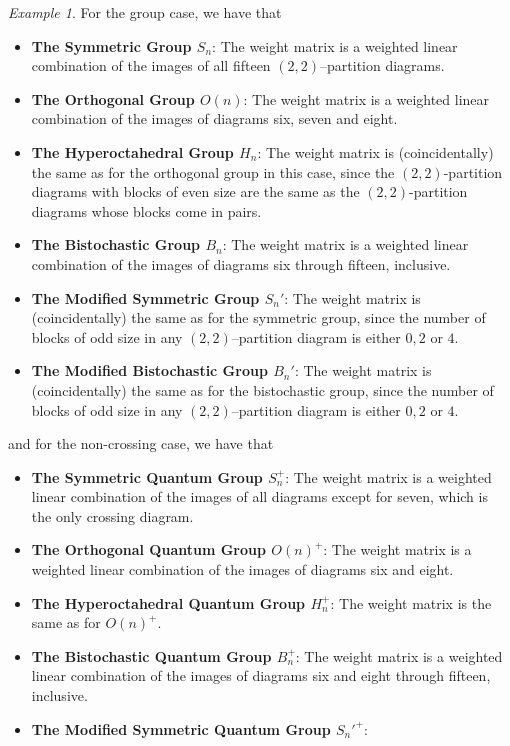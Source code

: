 \documentclass{article}
\theoremstyle{plain}
\theoremstyle{definition}
\theoremstyle{remark}
\newtheorem{example}[theorem]{Example}
\begin{document}
\begin{example}
For the group case, we have that
\begin{itemize}
	\item
		\textbf{The Symmetric Group $S_n$}:
		The weight matrix is a weighted linear combination of the images of
		all fifteen $(2,2)$--partition diagrams.
	\item 
		\textbf{The Orthogonal Group $O(n)$}:
		The weight matrix is a weighted linear combination of the images of
		diagrams six, seven and eight.
	\item
		\textbf{The Hyperoctahedral Group $H_n$}:
		The weight matrix is (coincidentally) the same as for the orthogonal 
		group in this case, since the $(2,2)$-partition diagrams with blocks 
		of even size are the same as the $(2,2)$-partition diagrams whose 
		blocks come in pairs.
	\item
		\textbf{The Bistochastic Group $B_n$}:
		The weight matrix is a weighted linear combination of the images of
		diagrams six through fifteen, inclusive.
	\item
		\textbf{The Modified Symmetric Group $S_n'$}:
		The weight matrix is (coincidentally) the same as for the symmetric 
		group, since the number of blocks of odd size in any 
		$(2,2)$--partition diagram is either $0, 2$ or $4$.
	\item
		\textbf{The Modified Bistochastic Group $B_n'$}:
		The weight matrix is (coincidentally) the same as for the bistochastic 
		group, since the number of blocks of odd size in any 
		$(2,2)$--partition diagram is either $0, 2$ or $4$.
\end{itemize}
and for the non-crossing case, we have that
\begin{itemize}
	\item
		\textbf{The Symmetric Quantum Group $S_n^{+}$}:
		The weight matrix is a weighted linear combination of the images of
		all diagrams except for seven, which is the only crossing diagram.
	\item
		\textbf{The Orthogonal Quantum Group $O(n)^{+}$}:
		The weight matrix is a weighted linear combination of the images of
		diagrams six and eight.
	\item
		\textbf{The Hyperoctahedral Quantum Group $H_n^{+}$}:
		The weight matrix is the same as for $O(n)^{+}$.
	\item
		\textbf{The Bistochastic Quantum Group $B_n^{+}$}:
		The weight matrix is a weighted linear combination of the images of
		diagrams six and eight through fifteen, inclusive.	
	\item
		\textbf{The Modified Symmetric Quantum Group $S_n'^{+}$}:

\end{itemize}
\end{example}
\end{document}
